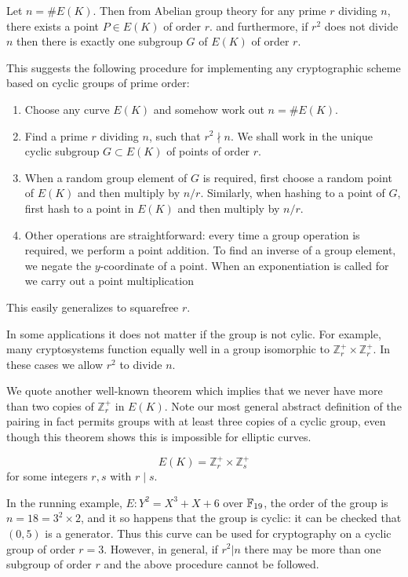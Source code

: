 Let $n = \#E(K)$. Then from Abelian group theory
for any prime $r$ dividing $n$,
there exists a point $P \in E(K)$ of order $r$.
and furthermore, if $r^2$ does not divide $n$ then there is exactly one
subgroup $G$ of $E(K)$ of order $r$.

This suggests the following procedure for implementing any cryptographic
scheme based on cyclic groups of prime order:

\begin{enumerate}
\item
Choose any curve $E(K)$ and somehow work out $n = \#E(K)$.
\item
Find a prime $r$ dividing $n$, such that $r^2 \nmid n$.
We shall work in the unique cyclic subgroup $G \subset E(K)$ of points
of order $r$.
\item
When a random group element of $G$ is required, first choose a random point
of $E(K)$ and then multiply by $n / r$. Similarly, when hashing to
a point of $G$, first hash to a point in $E(K)$ and then multiply by
$n / r$.
\item
Other operations are straightforward: every time a group
operation is required, we perform a point addition. To find an inverse
of a group element, we negate the $y$-coordinate of a point. When
an exponentiation is called for we carry out a point multiplication
\end{enumerate}

This easily generalizes to squarefree $r$.

In some applications it does not matter if the group is not
cylic. For example, many cryptosystems function equally well
in a group isomorphic to $\mathbb{Z}_{r}^+ \times \mathbb{Z}_{r}^+$.
In these cases we allow $r^2$ to divide $n$.

We quote another well-known theorem which implies that we
never have more than two copies of $\mathbb{Z}_r^+$ in
$E(K)$.
Note our most general abstract definition of the pairing in fact permits
groups with at least three copies of a cyclic group, even though this
theorem shows this is impossible for elliptic curves.

\begin{theorem}
\[ E(K) = \mathbb{Z}_r^+ \times \mathbb{Z}_s^+ \]
for some integers $r,s$ with $r \mid s$.
\end{theorem}

In the running example, $E : Y^2 = X^3 + X + 6$ over $\mathbb{F}_{19}$,
the order of the group is $n = 18 = 3^2 \times 2$, and it so happens
that the group is cyclic: it can be checked that $(0,5)$ is a generator.
Thus this curve can be used
for cryptography on a cyclic group of order $r = 3$. However, in general,
if $r^2 | n$ there may be more than one subgroup of order $r$ and the
above procedure cannot be followed.


